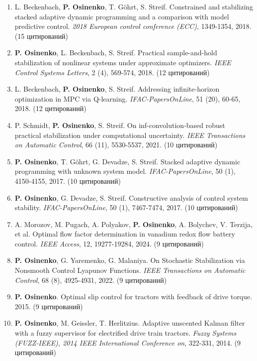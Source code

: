 \documentclass{article}
\begin{document}
\begin{enumerate}
\item L. Beckenbach, \textbf{P. Osinenko}, T. Göhrt, S. Streif. Constrained and stabilizing stacked adaptive dynamic programming and a comparison with model predictive control. \textit{2018 European control conference (ECC)}, 1349-1354, 2018. (15 цитирований)

\item \textbf{P. Osinenko}, L. Beckenbach, S. Streif. Practical sample-and-hold stabilization of nonlinear systems under approximate optimizers. \textit{IEEE Control Systems Letters}, 2 (4), 569-574, 2018. (12 цитирований)

\item L. Beckenbach, \textbf{P. Osinenko}, S. Streif. Addressing infinite-horizon optimization in MPC via Q-learning. \textit{IFAC-PapersOnLine}, 51 (20), 60-65, 2018. (12 цитирований)

\item P. Schmidt, \textbf{P. Osinenko}, S. Streif. On inf-convolution-based robust practical stabilization under computational uncertainty. \textit{IEEE Transactions on Automatic Control}, 66 (11), 5530-5537, 2021. (10 цитирований)

\item \textbf{P. Osinenko}, T. Göhrt, G. Devadze, S. Streif. Stacked adaptive dynamic programming with unknown system model. \textit{IFAC-PapersOnLine}, 50 (1), 4150-4155, 2017. (10 цитирований)

\item \textbf{P. Osinenko}, G. Devadze, S. Streif. Constructive analysis of control system stability. \textit{IFAC-PapersOnLine}, 50 (1), 7467-7474, 2017. (10 цитирований)

\item A. Morozov, M. Pugach, A. Polyakov, \textbf{P. Osinenko}, A. Bolychev, V. Terzija, et al. Optimal flow factor determination in vanadium redox flow battery control. \textit{IEEE Access}, 12, 19277-19284, 2024. (9 цитирований)

\item \textbf{P. Osinenko}, G. Yaremenko, G. Malaniya. On Stochastic Stabilization via Nonsmooth Control Lyapunov Functions. \textit{IEEE Transactions on Automatic Control}, 68 (8), 4925-4931, 2022. (9 цитирований)

\item \textbf{P. Osinenko}. Optimal slip control for tractors with feedback of drive torque. 2015. (9 цитирований)

\item \textbf{P. Osinenko}, M. Geissler, T. Herlitzius. Adaptive unscented Kalman filter with a fuzzy supervisor for electrified drive train tractors. \textit{Fuzzy Systems (FUZZ-IEEE), 2014 IEEE International Conference on}, 322-331, 2014. (9 цитирований)


\end{enumerate}
\end{document}
